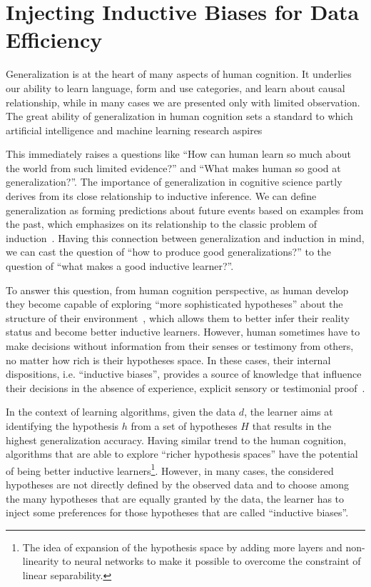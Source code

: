 \part{Injecting Inductive Biases for Data Efficiency}
\label{part3}

Generalization is at the heart of many aspects of human cognition. It underlies our ability to learn language, form and use categories, and learn about causal relationship, while in many cases we are presented only with limited observation. The great ability of generalization in human cognition sets a standard to which artificial intelligence and machine learning research aspires

This immediately raises a questions like ``How can human learn so much about the world from such limited evidence?'' and ``What makes human so good at generalization?''.
The importance of generalization in cognitive science partly derives
from its close relationship to inductive inference.  We can define generalization as forming predictions about future events based on examples from the past, which emphasizes on its relationship to the classic problem of induction~\citep{hume2003treatise}. 
Having this connection between generalization and induction in mind, we can cast the question of ``how to produce good generalizations?'' to the question of ``what makes a good inductive learner?''.


To answer this question, from human cognition perspective, as human develop they become capable of exploring ``more sophisticated hypotheses'' about the structure of their environment~\citep{inhelder1958growth}, which allows them to better infer their reality status and become better inductive learners. However, human sometimes have to make decisions without information from their senses or testimony from others, no matter how rich is their hypotheses space. In these cases, their internal dispositions, i.e. ``inductive biases'', provides a source of knowledge that influence their decisions in the absence of experience, explicit sensory or testimonial proof~\cite{sodian1987children,griffiths2010probabilistic}.


In the context of learning algorithms, given the data $d$, the learner aims at identifying the hypothesis $h$ from a set of hypotheses $H$ that results in the highest generalization accuracy.  Having similar trend to the human cognition, algorithms that are able to explore ``richer hypothesis spaces'' have the potential of being better inductive learners\footnote{The idea of expansion of the hypothesis space by adding more layers and non-linearity to neural networks to make it possible to overcome the constraint of linear separability.}. However, in many cases, the considered hypotheses are not directly defined by the observed data and to choose among the many hypotheses that are equally granted by the data, the learner has to inject some preferences for those hypotheses that are called ``inductive biases''. 


